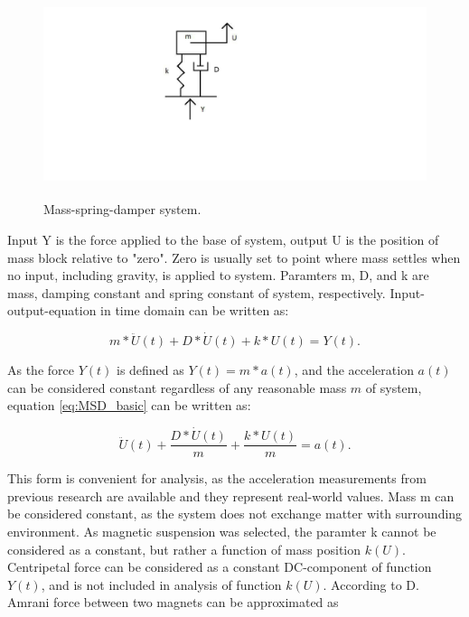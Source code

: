 \begin{figure}[htb]
\begin{center}
\includegraphics[height=6cm]{images/own_dwg/MSD.jpg}
\end{center}
\caption{\label{MSD} Mass-spring-damper system.}
\end{figure}

Input Y is the force applied to the base of system, output U is the position of mass block relative to "zero". Zero is usually set to point where mass settles when no input, including gravity, is applied to system. Paramters m, D, and k are mass, damping constant and spring constant of system, respectively. Input-output-equation in time domain can be written as: 

\begin{equation}\label{eq:MSD_basic}
  m * \ddot{U}(t) + D * \dot{U}(t) + k * U(t) = Y(t). 
\end{equation}

As the force $ Y(t) $ is defined as $ Y(t) = m*a(t) $, and the acceleration $ a(t)$ can be considered constant regardless of any reasonable mass $ m $ of system, equation \eqref{eq:MSD_basic} can be written as:

\begin{equation}\label{eq:MSD_acceleration}
 \ddot{U}(t) + \frac{D * \dot{U}(t)}{m} + \frac{k * U(t)}{m} = a(t). 
\end{equation}

This form is convenient for analysis, as the acceleration measurements from previous research are available and they represent real-world values. Mass m can be considered constant, as the system does not exchange matter with surrounding environment. As magnetic suspension was selected, the paramter k cannot be considered as a constant, but rather a function of mass position $k(U)$. Centripetal force can be considered as a constant DC-component of function $Y(t)$, and is not included in analysis of function $k(U)$. According to D. Amrani \cite{Amrani2015} force between two magnets can be approximated as

